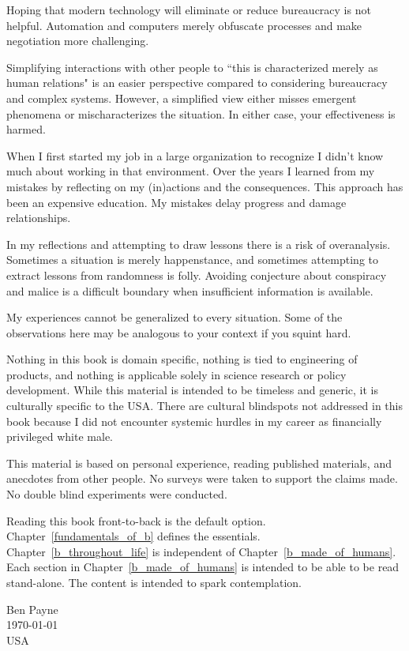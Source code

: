 Hoping that modern technology will eliminate or reduce bureaucracy is not helpful. Automation and computers merely obfuscate processes and make negotiation more challenging. 

Simplifying interactions with other people to ``this is characterized merely as human relations" is an easier perspective compared to considering bureaucracy and complex systems. However, a simplified view either misses emergent phenomena or mischaracterizes the situation. In either case, your effectiveness is harmed.


 When I first started my job in a large organization to recognize I didn't know much about working in that environment. Over the years I learned from my mistakes by reflecting on my (in)actions and the consequences. This approach has been an expensive education. My mistakes delay progress and damage relationships.



In my reflections and attempting to draw lessons there is a risk of overanalysis. Sometimes a situation is merely happenstance, and sometimes attempting to extract lessons from randomness is folly. Avoiding conjecture about conspiracy and malice is a difficult boundary when insufficient information is available. 

My experiences cannot be generalized to every situation. Some of the observations here may be analogous to your context if you squint hard. 

Nothing in this book is domain specific, nothing is tied to engineering of products, and nothing is applicable solely in science research or policy development. While this material is intended to be timeless and generic, it is culturally specific to the USA. There are cultural blindspots not addressed in this book because I did not encounter systemic hurdles in my career as financially privileged white male. 

This material is based on personal experience, reading published materials, and anecdotes from other people. No surveys were taken to support the claims made. No double blind experiments were conducted. 

Reading this book front-to-back is the default option. Chapter~\ref{fundamentals_of_b} defines the essentials. Chapter~\ref{b_throughout_life} is independent of Chapter~\ref{b_made_of_humans}. Each section in Chapter~\ref{b_made_of_humans} is intended to be able to be read stand-alone. The content is intended to spark contemplation. 


\begin{flushright}
Ben Payne\\
\today\\
USA
\end{flushright}


